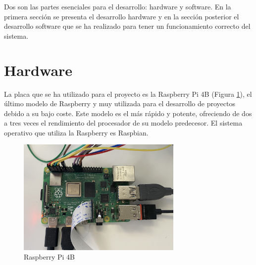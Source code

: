 Dos son las partes esenciales para el desarrollo: hardware y software. En la primera sección se presenta el desarrollo hardware y en la sección posterior el desarrollo software que se ha realizado para tener un funcionamiento correcto del sistema.


\section{Hardware}
La placa que se ha utilizado para el proyecto es la Raspberry Pi 4B (Figura \ref{fig:rasp}), el último modelo de Raspberry y muy utilizada para el desarrollo de proyectos debido a su bajo coste. Este modelo es el más rápido y potente, ofreciendo de dos a tres veces el rendimiento del procesador de su modelo predecesor. El sistema operativo que utiliza la Raspberry es Raspbian.
\begin{figure} [h!]
  \begin{center}
    \includegraphics[width=8cm]{figs/raspberry}
  \end{center}
  \caption{Raspberry Pi 4B}
  \label{fig:rasp}
\end{figure}\\

